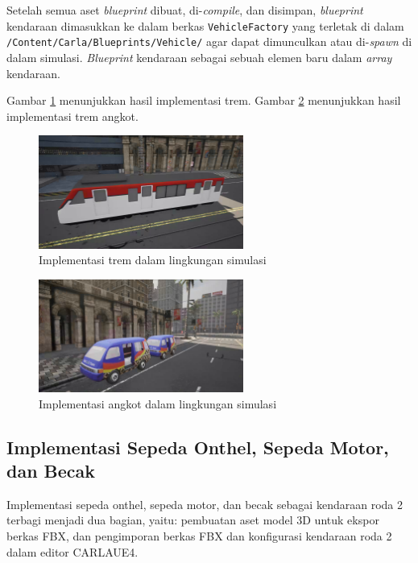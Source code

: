 Setelah semua aset \textit{blueprint} dibuat, di-\textit{compile}, dan disimpan,
\textit{blueprint} kendaraan dimasukkan ke dalam berkas \verb|VehicleFactory|
yang terletak di dalam \verb|/Content/Carla/Blueprints/Vehicle/| agar dapat
dimunculkan atau di-\textit{spawn} di dalam simulasi. \textit{Blueprint}
kendaraan sebagai sebuah elemen baru dalam \textit{array} kendaraan.

Gambar \ref{fig:tram-carla} menunjukkan hasil implementasi trem. Gambar
\ref{fig:angkot-carla} menunjukkan hasil implementasi trem  angkot.

\begin{figure}[!h]
    \centering
    \includegraphics[width=0.6\textwidth]{resources/chapter-4/tram-carla.png}
    \caption{Implementasi trem dalam lingkungan simulasi}
    \label{fig:tram-carla}
\end{figure}

\begin{figure}[!h]
    \centering
    \includegraphics[width=0.6\textwidth]{resources/chapter-4/angkot.png}
    \caption{Implementasi angkot dalam lingkungan simulasi}
    \label{fig:angkot-carla}
\end{figure}

\subsection{Implementasi Sepeda Onthel, Sepeda Motor, dan Becak}

Implementasi sepeda onthel, sepeda motor, dan becak sebagai kendaraan roda 2
terbagi menjadi dua bagian, yaitu: pembuatan aset model 3D untuk ekspor berkas
FBX, dan pengimporan berkas FBX dan konfigurasi kendaraan roda 2 dalam editor
CARLAUE4.

